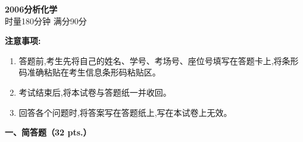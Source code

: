 \begin{center}
    {\LARGE \textbf{2006分析化学}} \\[2ex]
    {\large 时量180分钟 \quad 满分90分}
\end{center}

\vspace{0.5cm}
\noindent\textbf{注意事项:}
\begin{enumerate}[label=\arabic*., parsep=0pt, itemsep=0pt]
    \item 答题前,考生先将自己的姓名、学号、考场号、座位号填写在答题卡上,将条形码准确粘贴在考生信息条形码粘贴区。
    \item 考试结束后,将本试卷与答题纸一并收回。
    \item 回答各个问题时,将答案写在答题纸上,写在本试卷上无效。
\end{enumerate}

\vspace{0.5cm}
\noindent\textbf{一、简答题（32 pts.）}


